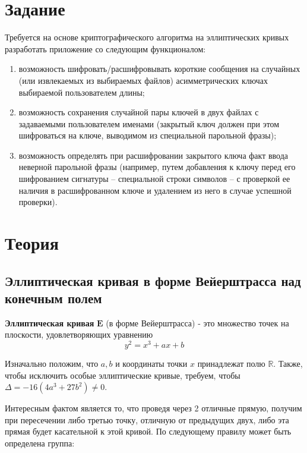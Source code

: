 \section{Задание}

Требуется на основе криптографического алгоритма на эллиптических кривых разработать приложение со следующим функционалом:

\begin{enumerate}
	\item возможность шифровать/расшифровывать короткие сообщения на случайных (или извлекаемых из выбираемых файлов) асимметрических ключах выбираемой пользователем длины;
	\item возможность сохранения случайной пары ключей в двух файлах с задаваемыми пользователем именами (закрытый ключ должен при этом шифроваться на ключе, выводимом из специальной парольной фразы);
	\item возможность определять при расшифровании закрытого ключа факт ввода неверной парольной фразы (например, путем добавления к ключу перед его шифрованием сигнатуры – специальной строки символов – с проверкой ее наличия в расшифрованном ключе и удалением из него в случае успешной проверки).
\end{enumerate}

\section{Теория}

\subsection{Эллиптическая кривая в форме Вейерштрасса над конечным полем}

\textbf{Эллиптическая кривая} $\mathbf E$ (в форме Вейерштрасса) - это множество точек на плоскости, удовлетворяющих уравнению
%
\[
y^2 = x^3 + ax + b
\]

Изначально положим, что $a, b$ и координаты точки $x$ принадлежат полю $\mathbb R$. Также, чтобы исключить особые эллиптические кривые, требуем, чтобы $\Delta=-16(4a^3+27b^2) \neq 0$.

Интересным фактом является то, что проведя через 2 отличные прямую, получим при пересечении либо третью точку, отличную от предыдущих двух, либо эта прямая будет касательной к этой кривой. По следующему правилу может быть определена группа:

